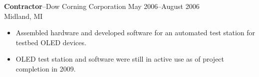 \documentclass[10pt]{article}
\newcommand{\jobitem}[4]{
    \vspace{2pt}

    \textbf{#1}--#2 \hfill #3\\ #4

    \vspace{-8pt}
}
\begin{document}

\vspace{-6pt}
\jobitem{Contractor}{Dow Corning Corporation}{May 2006--August 2006}{Midland, MI}

\begin{itemize}\setlength{\itemsep}{0cm}
  \setlength{\parskip}{0cm}
\item Assembled hardware and developed software for an automated test station for testbed OLED devices. 
\item OLED test station and software were still in active use as of project completion in 2009.
\end{itemize}
%
\end{document}
